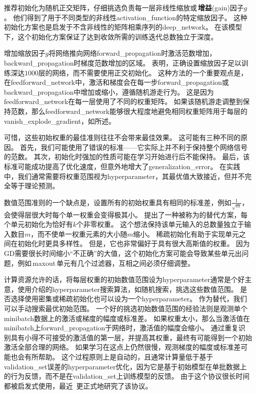 \cite{Saxe-et-al-2013}推荐初始化为随机正交矩阵，仔细挑选负责每一层非线性缩放或\,\textbf{增益}(gain)因子$g$。
他们得到了用于不同类型的非线性\gls{activation_function}的特定缩放因子。
这种初始化方案也是启发于不含非线性的矩阵相乘序列的\gls{deep_network}。
在该模型下，这个初始化方案保证了达到收敛所需的训练迭代总数独立于深度。


增加缩放因子$g$将网络推向网络\gls{forward_propagation}时激活范数增加，\gls{backward_propagation}时梯度范数增加的区域。
\cite{Sussillo-2014}表明，正确设置缩放因子足以训练深达$1000$层的网络，而不需要使用正交初始化。
这种方法的一个重要观点是，在\gls{feedforward_network}中，激活和梯度会在每一步\gls{forward_propagation}或\gls{backward_propagation}中增加或缩小，遵循随机游走行为。
这是因为\gls{feedforward_network}在每一层使用了不同的权重矩阵。
如果该随机游走调整到保持范数，那么\gls{feedforward_network}能够很大程度地避免相同权重矩阵用于每层的\gls{vanish_explode_gradient}，如所述。


可惜，这些初始权重的最佳准则往往不会带来最佳效果。
这可能有三种不同的原因。
首先，我们可能使用了错误的标准——它实际上并不利于保持整个网络信号的范数。
其次，初始化时强加的性质可能在学习开始进行后不能保持。
最后，该标准可能成功提高了优化速度，但意外地增大了\gls{generalization_error}。
在实践中，我们通常需要将权重范围视为\gls{hyperparameter}，其最优值大致接近，但并不完全等于理论预测。


数值范围准则的一个缺点是，设置所有的初始权重具有相同的标准差，例如$\frac{1}{\sqrt{m}}$，会使得层很大时每个单一权重会变得极其小。
\cite{Martens-2010}提出了一种被称为的替代方案，每个单元初始化为恰好有$k$个非零权重。
这个想法保持该单元输入的总数量独立于输入数目$m$，而不使单一权重元素的大小随$m$缩小。
稀疏初始化有助于实现单元之间在初始化时更具多样性。
但是，它也非常偏好于具有很大高斯值的权重。
因为\gls{GD}需要很长时间缩小``不正确''的大值，这个初始化方案可能会导致某些单元出问题，例如\,\gls{maxout}\,单元有几个过滤器，互相之间必须仔细调整。


计算资源允许的话，将每层权重的初始数值范围设为\gls{hyperparameter}通常是个好主意，使用介绍的\gls{hyperparameter}搜索算法，如随机搜索，挑选这些数值范围。
是否选择使用密集或稀疏初始化也可以设为一个\gls{hyperparameter}。
作为替代，我们可以手动搜索最优初始范围。
一个好的挑选初始数值范围的经验法则是观测单个\gls{minibatch}数据上的激活或梯度的幅度或标准差。
如果权重太小，那么当激活值在\gls{minibatch}上\gls{forward_propagation}于网络时，激活值的幅度会缩小。
通过重复识别具有小得不可接受的激活值的第一层，并提高其权重，最终有可能得到一个初始激活全部合理的网络。
如果学习在这点上仍然很慢，观测梯度的幅度或标准差可能也会有所帮助。
这个过程原则上是自动的，且通常计算量低于基于\gls{validation_set}误差的\gls{hyperparameter}优化，因为它是基于初始模型在单批数据上的行为反馈，而不是在\gls{validation_set}上训练模型的反馈。
由于这个协议很长时间都被启发式使用，最近~\cite{Mishkin-Matas-2015}更正式地研究了该协议。


